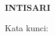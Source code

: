 \clearpage
{}
{}
\begin{center}
    \textbf{INTISARI}\\[0.5cm]
\end{center}

\lipsum[2-4]

\noindent Kata kunci: \keywordsid
